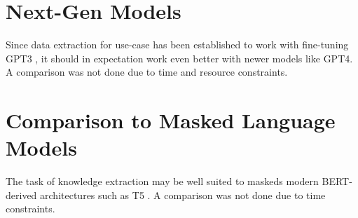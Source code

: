 \section{Next-Gen Models}\label{sec:next-gen}
Since data extraction for  use-case has been established to work with fine-tuning \gls{GPT3} \cite{dunn_structured_2022}, it should in expectation work even better with newer models like \gls{GPT4}.
A comparison was not done due to time and resource constraints.

\section{Comparison to Masked Language Models}\label{sec:masked}
The task of knowledge extraction may be well suited to \glspl{masked} modern \gls{BERT}-derived architectures such as T5 \cite{raffel_exploring_2020}.
A comparison was not done due to time constraints.
